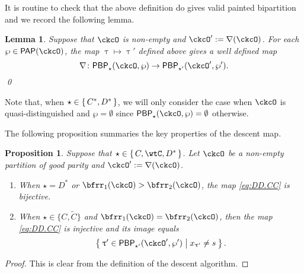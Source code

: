 \documentclass[12pt,a4paper]{amsart}
\def\DD{\nabla}
\numberwithin{equation}{section}
\newtheorem{lem}[thm]{Lemma}
\newtheorem{prop}[thm]{Proposition}
\theoremstyle{remark}
\def\DD{\nabla}
\def\PP{\mathsf{PAP}}
\def\PBP{\mathsf{PBP}}
\def\PBPop#1#2#3#4{\PBP_{#1}^{#2}(#3,#4)}
\newcommand{\PBPOP}[1][]{\PBPop{\star}{#1}{\ckcO}{\wp}}
\def\PBPOPp{\PBPop{\star'}{}{\ckcO'}{\wp'}}
\begin{document}
It is routine to check that the above definition do gives valid painted
bipartition and we record the following lemma.
\begin{lem}
  Suppose that $\ckcO$ is non-empty and $\ckcO' := \DD(\ckcO)$.
  For each $\wp\in \PP(\ckcO)$, the map $\uptau\mapsto \uptau'$ defined above
  gives a well defined map
  \begin{equation}
    \label{eq:DD.CC}
    \DD \colon \PBPOP \rightarrow \PBPOPp.
  \end{equation}
  \qed
\end{lem}

Note that, when $\star\in \set{C^{*}, D^{*}}$, we will only consider the case
when $\ckcO$ is quasi-distinguished and $\wp=\emptyset$ since
$\PBPOP = \emptyset $ otherwise.


The following proposition summaries the key properties of the descent map.
\begin{prop} \label{lem:PBPd.C}
  Suppose that $\star\in \set{C,\wtC, D^*}$. Let $\ckcO$ be a non-empty partition of good
  parity and $\ckcO' := \DD(\ckcO)$.
  \begin{enumerate}[label=(\alph*)]
    \item When $\star = D^{*}$ or $\bfrr_1(\ckcO)>\bfrr_2(\ckcO)$,
    the map \eqref{eq:DD.CC} is bijective. %
    \item When $\star\in \{C,\widetilde C\}$ and $\bfrr_1(\ckcO)=\bfrr_2(\ckcO)$,
    then the  map \eqref{eq:DD.CC} is injective and its image equals
    \[
      \Set{\uptau'\in \PBPOPp |  x_{\uptau'}\neq s}.
    \]
  \end{enumerate}
\end{prop}
\begin{proof}
  This is clear from the definition of the descent algorithm.
\end{proof}
\end{document}
